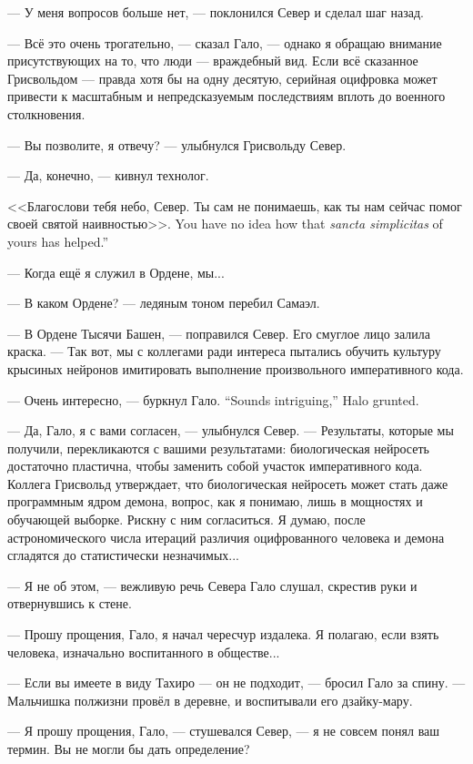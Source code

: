 --- У меня вопросов больше нет, --- поклонился Север и сделал шаг назад.

--- Всё это очень трогательно, --- сказал Гало, --- однако я обращаю внимание присутствующих на то, что люди --- враждебный вид.
Если всё сказанное Грисвольдом --- правда хотя бы на одну десятую, серийная оцифровка может привести к масштабным и непредсказуемым последствиям вплоть до военного столкновения.

--- Вы позволите, я отвечу? --- улыбнулся Грисвольду Север.

--- Да, конечно, --- кивнул технолог.

<<Благослови тебя небо, Север.
{Ты сам не понимаешь, как ты нам сейчас помог своей святой наивностью>>.}
{You have no idea how that \textit{sancta simplicitas} of yours has helped.''}

--- Когда ещё я служил в Ордене, мы...

--- В каком Ордене? --- ледяным тоном перебил Самаэл.

--- В Ордене Тысячи Башен, --- поправился Север.
Его смуглое лицо залила краска.
--- Так вот, мы с коллегами ради интереса пытались обучить культуру крысиных нейронов имитировать выполнение произвольного императивного кода.

{--- Очень интересно, --- буркнул Гало.}
{``Sounds intriguing,'' Halo grunted.}

--- Да, Гало, я с вами согласен, --- улыбнулся Север.
--- Результаты, которые мы получили, перекликаются с вашими результатами: биологическая нейросеть достаточно пластична, чтобы заменить собой участок императивного кода.
Коллега Грисвольд утверждает, что биологическая нейросеть может стать даже программным ядром демона, вопрос, как я понимаю, лишь в мощностях и обучающей выборке.
Рискну с ним согласиться.
Я думаю, после астрономического числа итераций различия оцифрованного человека и демона сгладятся до статистически незначимых...

--- Я не об этом, --- вежливую речь Севера Гало слушал, скрестив руки и отвернувшись к стене.

--- Прошу прощения, Гало, я начал чересчур издалека.
Я полагаю, если взять человека, изначально воспитанного в обществе...

--- Если вы имеете в виду Тахиро --- он не подходит, --- бросил Гало за спину.
--- Мальчишка полжизни провёл в деревне, и воспитывали его дзайку-мару.

--- Я прошу прощения, Гало, --- стушевался Север, --- я не совсем понял ваш термин.
Вы не могли бы дать определение?

